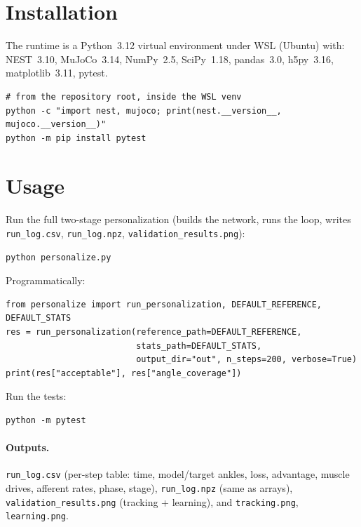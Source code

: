 \documentclass[11pt]{article}
\begin{document}
\section{Installation}
\label{sec:install}

The runtime is a Python~3.12 virtual environment under WSL (Ubuntu) with:
NEST~3.10, MuJoCo~3.14, NumPy~2.5, SciPy~1.18, pandas~3.0, h5py~3.16,
matplotlib~3.11, pytest.

\begin{lstlisting}
# from the repository root, inside the WSL venv
python -c "import nest, mujoco; print(nest.__version__, mujoco.__version__)"
python -m pip install pytest
\end{lstlisting}

\section{Usage}
\label{sec:usage}

Run the full two-stage personalization (builds the network, runs the loop,
writes \texttt{run\_log.csv}, \texttt{run\_log.npz}, \texttt{validation\_results.png}):

\begin{lstlisting}
python personalize.py
\end{lstlisting}

Programmatically:

\begin{lstlisting}
from personalize import run_personalization, DEFAULT_REFERENCE, DEFAULT_STATS
res = run_personalization(reference_path=DEFAULT_REFERENCE,
                          stats_path=DEFAULT_STATS,
                          output_dir="out", n_steps=200, verbose=True)
print(res["acceptable"], res["angle_coverage"])
\end{lstlisting}

Run the tests:

\begin{lstlisting}
python -m pytest
\end{lstlisting}

\paragraph{Outputs.} \texttt{run\_log.csv} (per-step table: time, model/target
ankles, loss, advantage, muscle drives, afferent rates, phase, stage),
\texttt{run\_log.npz} (same as arrays), \texttt{validation\_results.png}
(tracking + learning), and \texttt{tracking.png}, \texttt{learning.png}.
\end{document}
